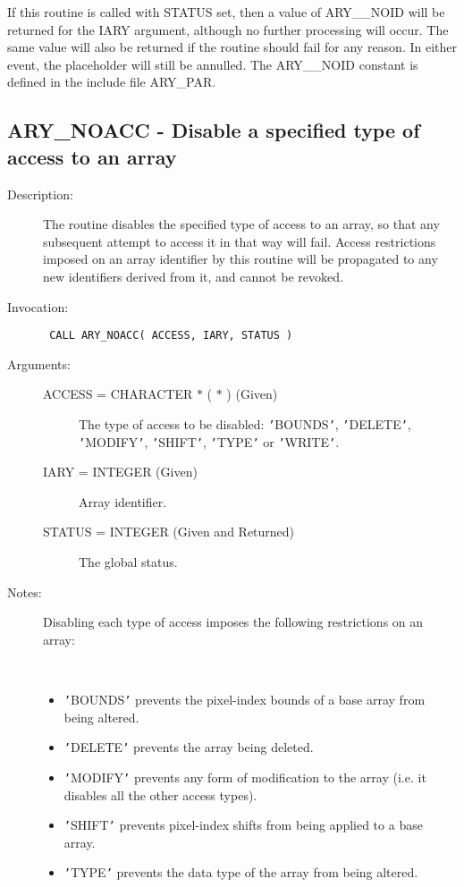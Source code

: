 \documentclass[twoside,11pt]{article}
\newcommand{\xlabel}[1]{}
\newlength{\sstbannerlength}
\newlength{\sstcaptionlength}
\newlength{\sstexampleslength}
\newlength{\sstexampleswidth}
\newcommand{\sstroutine}[3]{
   \goodbreak
   \rule{\textwidth}{0.5mm}
   \vspace{-7ex}
   \newline
   \settowidth{\sstbannerlength}{{\Large {\bf #1}}}
   \setlength{\sstcaptionlength}{\textwidth}
   \setlength{\sstexampleslength}{\textwidth}
   \addtolength{\sstbannerlength}{0.5em}
   \addtolength{\sstcaptionlength}{-2.0\sstbannerlength}
   \addtolength{\sstcaptionlength}{-5.0pt}
   \settowidth{\sstexampleswidth}{{\bf Examples:}}
   \addtolength{\sstexampleslength}{-\sstexampleswidth}
   \parbox[t]{\sstbannerlength}{\flushleft{\Large {\bf #1}}}
   \parbox[t]{\sstcaptionlength}{\center{\Large #2}}
   \parbox[t]{\sstbannerlength}{\flushright{\Large {\bf #1}}}
   \begin{description}
      #3
   \end{description}
}
\newcommand{\sstdescription}[1]{\item[Description:] #1}
\newcommand{\sstinvocation}[1]{\item[Invocation:]\hspace{0.4em}{\tt #1}}
\newcommand{\sstarguments}[1]{
   \item[Arguments:] \mbox{} \\
   \vspace{-3.5ex}
   \begin{description}
      #1
   \end{description}
}
\newcommand{\sstsubsection}[1]{ \item[{#1}] \mbox{} \\}
\newcommand{\sstnotes}[1]{\item[Notes:] \mbox{} \\[1.3ex] #1}
\newcommand{\sstitemlist}[1]{
  \mbox{} \\
  \vspace{-3.5ex}
  \begin{itemize}
     #1
  \end{itemize}
}
\newcommand{\sstitem}{\item}
\newcommand{\ssttt}{\tt}
\renewcommand{\sstroutine}[3]{
      \subsection{#1\xlabel{#1}-\label{#1}#2}
      \begin{description}
         #3
      \end{description}
   }
\renewcommand{\sstdescription}[1]{\item[Description:]
      \begin{description}
         #1
      \end{description}
   }
\renewcommand{\sstinvocation}[1]{\item[Invocation:]
      \begin{description}
         {\ssttt #1}
      \end{description}
   }
\renewcommand{\sstarguments}[1]{
      \item[Arguments:]
      \begin{description}
         #1
      \end{description}
   }
\renewcommand{\sstsubsection}[1]{\item[{#1}]}
\renewcommand{\sstnotes}[1]{\item[Notes:]
      \begin{description}
         #1
      \end{description}
   }
\newcommand{\sstitemlist}[1]{
      \begin{itemize}
         #1
      \end{itemize}
   }
\begin{document}
\begin{eqn*}
{{{         \sstitem
         If this routine is called with STATUS set, then a value of
         ARY\_\_NOID will be returned for the IARY argument, although no
         further processing will occur. The same value will also be
         returned if the routine should fail for any reason. In either
         event, the placeholder will still be annulled. The ARY\_\_NOID
         constant is defined in the include file ARY\_PAR.
      }
   }
}
\sstroutine{
   ARY\_NOACC
}{
   Disable a specified type of access to an array
}{
   \sstdescription{
      The routine disables the specified type of access to an array, so
      that any subsequent attempt to access it in that way will fail.
      Access restrictions imposed on an array identifier by this
      routine will be propagated to any new identifiers derived from
      it, and cannot be revoked.
   }
   \sstinvocation{
      CALL ARY\_NOACC( ACCESS, IARY, STATUS )
   }
   \sstarguments{
      \sstsubsection{
         ACCESS = CHARACTER $*$ ( $*$ ) (Given)
      }{
         The type of access to be disabled: {\tt '}BOUNDS{\tt '}, {\tt '}DELETE{\tt '},
         {\tt '}MODIFY{\tt '}, {\tt '}SHIFT{\tt '}, {\tt '}TYPE{\tt '} or {\tt '}WRITE{\tt '}.
      }
      \sstsubsection{
         IARY = INTEGER (Given)
      }{
         Array identifier.
      }
      \sstsubsection{
         STATUS = INTEGER (Given and Returned)
      }{
         The global status.
      }
   }
   \sstnotes{
      Disabling each type of access imposes the following restrictions
      on an array:
      \sstitemlist{

         \sstitem
         {\tt '}BOUNDS{\tt '} prevents the pixel-index bounds of a base array from
         being altered.

         \sstitem
         {\tt '}DELETE{\tt '} prevents the array being deleted.

         \sstitem
         {\tt '}MODIFY{\tt '} prevents any form of modification to the array (i.e.
         it disables all the other access types).

         \sstitem
         {\tt '}SHIFT{\tt '} prevents pixel-index shifts from being applied to a
         base array.

         \sstitem
         {\tt '}TYPE{\tt '} prevents the data type of the array from being altered.

}}}
\end{eqn*}
\end{document}
